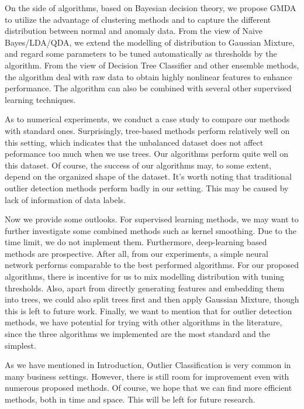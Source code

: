 \documentclass[english]{article}
\begin{document}
\par On the side of algorithms, based on Bayesian decision theory, we propose GMDA to utilize the advantage of clustering methods and to capture the different distribution between normal and anomaly data. From the view of Naive Bayes/LDA/QDA, we extend the modelling of distribution to Gaussian Mixture, and regard some parameters to be tuned automatically as thresholds by the algorithm. From the view of Decision Tree Classifier and other ensemble methods, the algorithm deal with raw data to obtain highly nonlinear features to enhance performance. The algorithm can also be combined with several other supervised learning techniques.

\par As to numerical experiments, we conduct a case study to compare our methods with standard ones. Surprisingly, tree-based methods perform relatively well on this setting, which indicates that the unbalanced dataset does not affect peformance too much when we use trees. Our algorithms perform quite well on this dataset. Of course, the success of our algorithms may, to some extent, depend on the organized shape of the dataset. It's worth noting that traditional outlier detection methods perform badly in our setting. This may be caused by lack of information of data labels.

\par Now we provide some outlooks. For supervised learning methods, we may want to further investigate some combined methods such as kernel smoothing. Due to the time limit, we do not implement them. Furthermore, deep-learning based methods are prospective. After all, from our experiments, a simple neural network performs comparable to the best performed algorithms. For our proposed algorithms, there is incentive for us to mix modelling distribution with tuning thresholds. Also, apart from directly generating features and embedding them into trees, we could also split trees first and then apply Gaussian Mixture, though this is left to future work. Finally, we want to mention that for outlier detection methods, we have potential for trying with other algorithms in the literature, since the three algorithms we implemented are the most standard and the simplest.

\par As we have mentioned in Introduction, Outlier Classification is very common in many business settings. However, there is still room for improvement even with numerous proposed methods. Of course, we hope that we can find more efficient methods, both in time and space. This will be left for future research.
\end{document}
